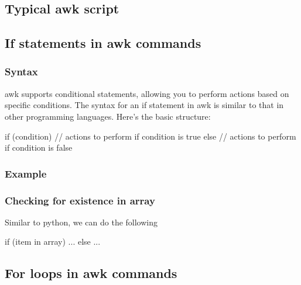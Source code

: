 \documentclass{report}
\begin{document}
    \bigbreak \noindent 
    \subsection{Typical awk script}
    \bigbreak \noindent 
    \bigbreak \noindent 

    \bigbreak \noindent 
    \subsection{If statements in awk commands}
    \bigbreak \noindent 
    \subsubsection{Syntax}
    \bigbreak \noindent 
    awk supports conditional statements, allowing you to perform actions based on specific conditions. The syntax for an if statement in awk is similar to that in other programming languages. Here's the basic structure:
    \bigbreak \noindent 
    \begin{bashcode}
        if (condition) {
            // actions to perform if condition is true
        } else {
            // actions to perform if condition is false
        }
    \end{bashcode}
    \bigbreak \noindent 
    \bigbreak \noindent 
    \subsubsection{Example}
    \bigbreak \noindent 
    \bigbreak \noindent 
    \subsubsection{Checking for existence in array}
    \bigbreak \noindent 
    Similar to python, we can do the following
    \bigbreak \noindent 
    \begin{bashcode}
        if (item in array) {
            ...
        } else {
            ...
        }
    \end{bashcode}

    \bigbreak \noindent 
    \subsection{For loops in awk commands}
    \bigbreak \noindent 
\end{document}
